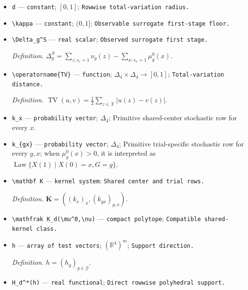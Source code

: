 \documentclass{article}
\begin{document}
\begin{itemize}
  \par\smallskip\noindent\emph{Definition.} \(\pi_{ga}^{\mathrm{obs}}(x)=\Pr\{X^{\mathrm{obs}}=x\mid G=g,A=a\}\).
  \item \texttt{d} --- \texttt{constant}; \([0,1]\); \texttt{Rowwise total-\allowbreak{}variation radius.}
  \item \texttt{\textbackslash{}\allowbreak{}kappa} --- \texttt{constant}; \((0,1]\); \texttt{Observable surrogate first-\allowbreak{}stage floor.}
  \item \texttt{\textbackslash{}\allowbreak{}Delta\_\allowbreak{}g\textasciicircum{}S} --- \texttt{real scalar}; \texttt{Observed surrogate first stage.}
  \par\smallskip\noindent\emph{Definition.} \(\Delta_g^S=\sum_{z:s_z=1}\nu_g(z)-\sum_{x:s_x=1}\mu_g^0(x)\).
  \item \texttt{\textbackslash{}\allowbreak{}operatorname\{TV\}\allowbreak{}} --- \texttt{function}; \(\Delta_4\times\Delta_4\to[0,1]\); \texttt{Total-\allowbreak{}variation distance.}
  \par\smallskip\noindent\emph{Definition.} \(\operatorname{TV}(u,v)=\tfrac12\sum_{z\in\mathcal X}|u(z)-v(z)|\).
  \item \texttt{k\_\allowbreak{}x} --- \texttt{probability vector}; \(\Delta_4\); Primitive shared-center stochastic row for every \(x\).
  \item \texttt{k\_\allowbreak{}\{gx\}\allowbreak{}} --- \texttt{probability vector}; \(\Delta_4\); Primitive trial-specific stochastic row for every \(g,x\); when \(\mu_g^0(x)>0\), it is interpreted as \(\operatorname{Law}\{X(1)\mid X(0)=x,G=g\}\).
  \item \texttt{\textbackslash{}\allowbreak{}mathbf K} --- \texttt{kernel system}; \texttt{Shared center and trial rows.}
  \par\smallskip\noindent\emph{Definition.} \(\mathbf K=((k_x)_x,(k_{gx})_{g,x})\).
  \item \texttt{\textbackslash{}\allowbreak{}mathfrak K\_\allowbreak{}d(\textbackslash{}\allowbreak{}mu\textasciicircum{}0,\allowbreak{}\textbackslash{}\allowbreak{}nu)} --- \texttt{compact polytope}; \texttt{Compatible shared-\allowbreak{}kernel class.}
  \item \texttt{h} --- \texttt{array of test vectors}; \((\mathbb R^4)^m\); \texttt{Support direction.}
  \par\smallskip\noindent\emph{Definition.} \(h=(h_g)_{g\in\mathcal G}\).
  \item \texttt{H\_\allowbreak{}d\textasciicircum{}*(h)} --- \texttt{real functional}; \texttt{Direct rowwise polyhedral support.}

\end{itemize}
\end{document}
